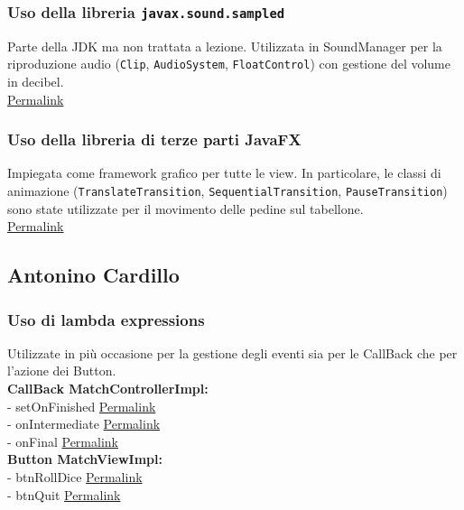 \documentclass[a4paper,12pt]{report}
\begin{document}
\subsubsection{Uso della libreria \texttt{javax.sound.sampled}}
Parte della JDK ma non trattata a lezione. Utilizzata in SoundManager per la riproduzione audio (\texttt{Clip}, \texttt{AudioSystem}, \texttt{FloatControl}) con gestione del volume in decibel.\\
\href{https://github.com/Nick-2002b/PSS25-Gioco-Oca/blob/e81943445d44f9befaaf74b02e1793cb20d0ce74/src/main/java/it/unibo/giocooca/audio/SoundManager.java#L136-L142}{Permalink}
\newpage
\subsubsection{Uso della libreria di terze parti JavaFX}
Impiegata come framework grafico per tutte le view. In particolare, le classi di animazione (\texttt{TranslateTransition}, \texttt{SequentialTransition}, \texttt{PauseTransition}) sono state utilizzate per il movimento delle pedine sul tabellone.\\
\href{https://github.com/Nick-2002b/PSS25-Gioco-Oca/blob/e81943445d44f9befaaf74b02e1793cb20d0ce74/src/main/java/it/unibo/giocooca/view/impl/BoardViewImpl.java#L399-L403}{Permalink}

\subsection{Antonino Cardillo}
\subsubsection{Uso di lambda expressions}
Utilizzate in più occasione per la gestione degli eventi sia per le CallBack che per l'azione dei Button. \\

\noindent\textbf{CallBack MatchControllerImpl:}\\
 - setOnFinished
 \href{https://github.com/Nick-2002b/PSS25-Gioco-Oca/blob/e81943445d44f9befaaf74b02e1793cb20d0ce74/src/main/java/it/unibo/giocooca/controller/impl/MatchControllerImpl.java#L98}{Permalink} \\
 - onIntermediate
 \href{https://github.com/Nick-2002b/PSS25-Gioco-Oca/blob/e81943445d44f9befaaf74b02e1793cb20d0ce74/src/main/java/it/unibo/giocooca/controller/impl/MatchControllerImpl.java#L116}{Permalink} \\
 - onFinal
 \href{https://github.com/Nick-2002b/PSS25-Gioco-Oca/blob/e81943445d44f9befaaf74b02e1793cb20d0ce74/src/main/java/it/unibo/giocooca/controller/impl/MatchControllerImpl.java#L128}{Permalink} \\
\textbf{Button MatchViewImpl:}\\
- btnRollDice
\href{https://github.com/Nick-2002b/PSS25-Gioco-Oca/blob/e81943445d44f9befaaf74b02e1793cb20d0ce74/src/main/java/it/unibo/giocooca/view/impl/MatchViewImpl.java#L158}{Permalink}\\
- btnQuit
\href{https://github.com/Nick-2002b/PSS25-Gioco-Oca/blob/e81943445d44f9befaaf74b02e1793cb20d0ce74/src/main/java/it/unibo/giocooca/view/impl/MatchViewImpl.java#L163}{Permalink}\\
\end{document}
